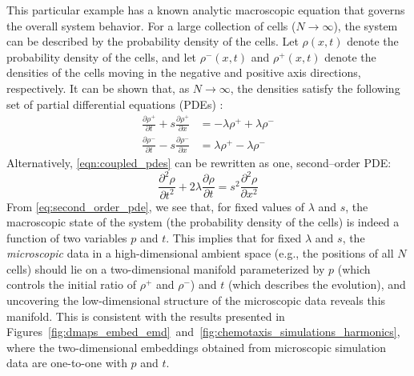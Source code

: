 \documentclass[3p]{elsarticle}
\begin{document}
This particular example has a known analytic macroscopic equation that governs the overall system behavior.
%
For a large collection of cells ($N \rightarrow \infty$), the system can be described by the probability density of the cells.
%
Let $\rho(x, t)$ denote the probability density of the cells, and let $\rho^-(x, t)$ and $\rho^+(x, t)$ denote the densities of the cells moving in the negative and positive axis directions, respectively.
%
It can be shown that, as $N \rightarrow \infty$, the densities satisfy the following set of partial differential equations (PDEs) \cite{othmer2000diffusion}:
\begin{equation} \label{eqn:coupled_pdes}
\begin{aligned}
\frac{\partial \rho^+}{\partial t} + s \frac{\partial \rho^+}{\partial x} & = -\lambda \rho^+ +\lambda \rho^- \\
\frac{\partial \rho^-}{\partial t} - s \frac{\partial \rho^-}{\partial x} & = \lambda \rho^+ -\lambda \rho^- 
\end{aligned}
\end{equation}
%
Alternatively, \eqref{eqn:coupled_pdes} can be rewritten as one, second--order PDE:
\begin{equation} \label{eq:second_order_pde}
\frac{\partial^2 \rho}{\partial t^2} + 2 \lambda \frac{\partial \rho}{\partial t} = s^2 \frac{\partial ^2 \rho}{\partial x^2}
\end{equation}
%
From \eqref{eq:second_order_pde}, we see that, for fixed values of $\lambda$ and $s$, the macroscopic state of the system (the probability density of the cells) is indeed a function of two variables $p$ and $t$. 
%
This implies that for fixed $\lambda$ and $s$, the {\em microscopic} data in a high-dimensional ambient space (e.g., the positions of all $N$ cells) should lie on a two-dimensional manifold parameterized by $p$ (which controls the initial ratio of $\rho^+$ and $\rho^-$) and $t$ (which describes the evolution), 
and uncovering the low-dimensional structure of the microscopic data reveals this manifold.
%
This is consistent with the results presented in Figures~\ref{fig:dmaps_embed_emd}~and~\ref{fig:chemotaxis_simulations_harmonics}, where the two-dimensional embeddings obtained from microscopic simulation data are one-to-one with $p$ and $t$.
\end{document}
